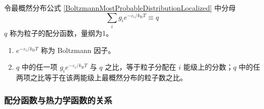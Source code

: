 \begin{definition}
    令最概然分布公式 \eqref{BoltzmannMostProbableDistributionLocalized} 中分母
    \begin{equation}
        \sum_{i} g_i e^{-\varepsilon_i / k_\mathrm{B} T} \equiv q
    \end{equation}
    $q$ 称为粒子的配分函数，量纲为1。
\end{definition}

\begin{enumerate}
    \item $e^{-\varepsilon_i / k_\mathrm{B} T}$ 称为 Boltzmann 因子。
    \item $q$ 中的任一项 $g_i e^{-\varepsilon_i / k_\mathrm{B} T}$ 与 $q$ 之比，等于粒子分配在 $i$ 能级上的分数；$q$ 中的任两项之比等于在该两能级上最概然分布的粒子数之比。
\end{enumerate}

\subsubsection{配分函数与热力学函数的关系}

